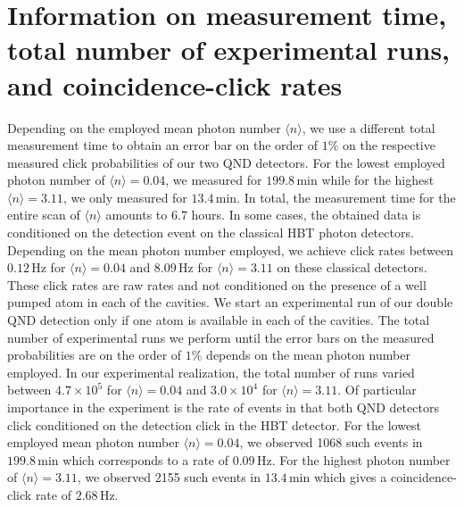 \documentclass[prl,twocolumn,amsmath,amssymb,bibnotes,aps,longbibliography]{revtex4-1}
\newcommand{\braket}[1]{\langle{#1}\rangle}
\begin{document}
\section{Information on measurement time, total number of experimental runs, and coincidence-click rates}
Depending on the employed mean photon number $\braket{n}$, we use a different total measurement time to obtain an error bar on the order of $1\%$ on the respective measured click probabilities of our two QND detectors. For the lowest employed photon number of $\braket{n}=0.04$, we measured for $199.8\,\mathrm{min}$ while for the highest $\braket{n}=3.11$, we only measured for $13.4\,\mathrm{min}$. In total, the measurement time for the entire scan of $\braket{n}$ amounts to $6.7$ hours. In some cases, the obtained data is conditioned on the detection event on the classical HBT photon detectors. Depending on the mean photon number employed, we achieve click rates between $0.12\,\mathrm{Hz}$ for $\braket{n}=0.04$ and $8.09\,\mathrm{Hz}$ for $\braket{n}=3.11$ on these classical detectors. These click rates are raw rates and not conditioned on the presence of a well pumped atom in each of the cavities. We start an experimental run of our double QND detection only if one atom is available in each of the cavities. The total number of experimental runs we perform until the error bars on the measured probabilities are on the order of $1\%$ depends on the mean photon number employed. In our experimental realization, the total number of runs varied between $4.7\times10^5$ for $\braket{n}=0.04$ and $3.0\times10^4$ for $\braket{n}=3.11$. Of particular importance in the experiment is the rate of events in that both QND detectors click conditioned on the detection click in the HBT detector. For the lowest employed mean photon number $\braket{n}=0.04$, we observed 1068 such events in $199.8\,\mathrm{min}$ which corresponds to a rate of $0.09\,\mathrm{Hz}$. For the highest photon number of $\braket{n}=3.11$, we observed 2155 such events in $13.4\,\mathrm{min}$ which gives a coincidence-click rate of $2.68\,\mathrm{Hz}$.   
\end{document}

